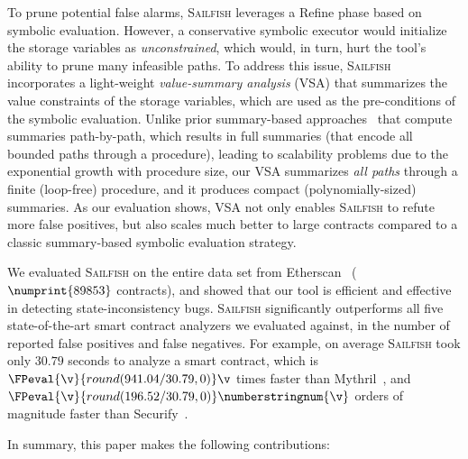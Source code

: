 \documentclass[conference, romanappendices]{tex/IEEEtran}
\theoremstyle{bfnote}
\newcommand{\toolname}{\textsc{Sailfish}\xspace}
\newcommand{\refine}{{\sc Refine}\xspace}
\newcommand{\securify}{{\sc Securify}\xspace}
\newcommand{\smart}{smart contract}
\newcommand{\etherscan}{{\sc Etherscan}\xspace}
\newcommand{\si}{{state-inconsistency}\xspace}
\newcommand{\vsa}{{value-summary analysis}\xspace}
\newcommand{\mythril}{{\sc Mythril}\xspace}
\let\num\numprint
\newcommand{\dataset}{89853}
\newcommand{\securifyAnalysisTimeFull}{196.52}
\newcommand{\mythrilAnalysisTimeFull}{941.04}
\newcommand{\clintAnalysisTimeFull}{30.79}
\begin{document}
To prune potential false alarms, \toolname leverages a \refine phase based on symbolic evaluation.
However, a conservative symbolic executor would initialize the storage variables as \textit{unconstrained}, which would, in turn, hurt the tool's ability to prune many infeasible paths.
To address this issue, \toolname incorporates a light-weight \emph{\vsa} (VSA) that summarizes the value constraints of the storage variables, which are used as the pre-conditions of the symbolic evaluation.
Unlike prior summary-based approaches~\cite{solar,Godefroid07,AnandGT08} that compute summaries path-by-path, which results in full summaries (that encode all bounded paths through a procedure), leading to scalability problems due to the exponential growth with procedure size, 
our VSA summarizes \emph{all paths} through a finite (loop-free) procedure, and it produces compact (polynomially-sized) summaries.
As our evaluation shows, VSA not only enables \toolname to refute more false positives, but also scales much better to large contracts compared to a classic summary-based symbolic evaluation strategy.

We evaluated \toolname on the entire data set from \etherscan~\cite{etherscan} ($\num{\dataset}$ contracts), and showed that our tool is efficient and effective in detecting \si bugs.
\toolname significantly outperforms all five state-of-the-art \smart{} analyzers we evaluated against, in the number of reported false positives and false negatives.
For example, on average \toolname took only $\clintAnalysisTimeFull$ seconds to analyze a \smart, which is $\FPeval{\v}{round(\mythrilAnalysisTimeFull/\clintAnalysisTimeFull,0)}\v$ times faster than \mythril~\cite{mythril}, and $\FPeval{\v}{round(\securifyAnalysisTimeFull/\clintAnalysisTimeFull,0)}\text{\numberstringnum{\v}}$ orders of magnitude faster than \securify~\cite{securify}. 

In summary, this paper makes the following contributions: 
\end{document}
